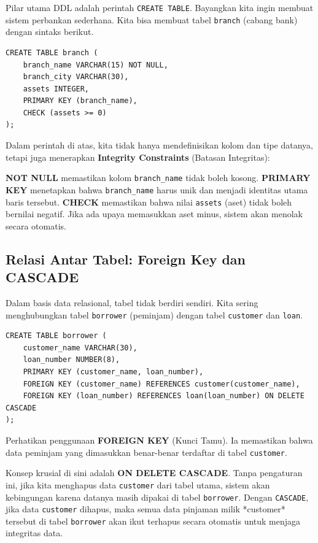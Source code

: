 \documentclass[11pt,a4paper]{article}
\begin{document}
Pilar utama DDL adalah perintah \texttt{CREATE TABLE}. Bayangkan kita ingin membuat sistem perbankan sederhana. Kita bisa membuat tabel \texttt{branch} (cabang bank) dengan sintaks berikut.

\begin{lstlisting}
CREATE TABLE branch (
    branch_name VARCHAR(15) NOT NULL,
    branch_city VARCHAR(30),
    assets INTEGER,
    PRIMARY KEY (branch_name),
    CHECK (assets >= 0)
);
\end{lstlisting}

Dalam perintah di atas, kita tidak hanya mendefinisikan kolom dan tipe datanya, tetapi juga menerapkan \textbf{Integrity Constraints} (Batasan Integritas):

\textbf{NOT NULL} memastikan kolom \texttt{branch\_name} tidak boleh kosong. \textbf{PRIMARY KEY} menetapkan bahwa \texttt{branch\_name} harus unik dan menjadi identitas utama baris tersebut. \textbf{CHECK} memastikan bahwa nilai \texttt{assets} (aset) tidak boleh bernilai negatif. Jika ada upaya memasukkan aset minus, sistem akan menolak secara otomatis.

\subsection{Relasi Antar Tabel: Foreign Key dan CASCADE}
Dalam basis data relasional, tabel tidak berdiri sendiri. Kita sering menghubungkan tabel \texttt{borrower} (peminjam) dengan tabel \texttt{customer} dan \texttt{loan}.

\begin{lstlisting}
CREATE TABLE borrower (
    customer_name VARCHAR(30),
    loan_number NUMBER(8),
    PRIMARY KEY (customer_name, loan_number),
    FOREIGN KEY (customer_name) REFERENCES customer(customer_name),
    FOREIGN KEY (loan_number) REFERENCES loan(loan_number) ON DELETE CASCADE
);
\end{lstlisting}

Perhatikan penggunaan \textbf{FOREIGN KEY} (Kunci Tamu). Ia memastikan bahwa data peminjam yang dimasukkan benar-benar terdaftar di tabel \texttt{customer}.

Konsep krusial di sini adalah \textbf{ON DELETE CASCADE}. Tanpa pengaturan ini, jika kita menghapus data \texttt{customer} dari tabel utama, sistem akan kebingungan karena datanya masih dipakai di tabel \texttt{borrower}. Dengan \texttt{CASCADE}, jika data \texttt{customer} dihapus, maka semua data pinjaman milik *customer* tersebut di tabel \texttt{borrower} akan ikut terhapus secara otomatis untuk menjaga integritas data.
\end{document}

